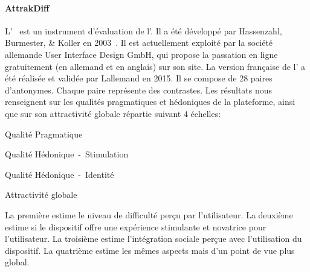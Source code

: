    \paragraph{AttrakDiff}\label{q:att}
    L'~ est un instrument  d’évaluation de l’. Il a été développé par Hassenzahl, Burmester, \& Koller en 2003~. Il est actuellement exploité par la société allemande User Interface Design GmbH, qui propose la passation en ligne gratuitement (en allemand et en anglais) sur son site. La version française de l’ a été réalisée et validée par Lallemand en 2015. Il se compose de 28 paires d’antonymes. Chaque paire représente des contrastes. %
    Les résultats nous renseignent sur les qualités pragmatiques et hédoniques de la plateforme, ainsi que sur son attractivité globale répartie suivant 4 échelles:
    \begin{enumerate}\myItemStyle
    \begin{multicols}{2}
        \item     Qualité Pragmatique
        \item     Qualité Hédonique~-~Stimulation
        \item     Qualité Hédonique~-~Identité
        \item     Attractivité globale
    \end{multicols}
    \end{enumerate}\par%
    La première estime le niveau de difficulté perçu par l'utilisateur.
    La deuxième estime si le dispositif offre une expérience stimulante et novatrice pour l'utilisateur.
    La troisième estime l'intégration sociale perçue avec l'utilisation du dispositif.
    La quatrième estime les mêmes aspects mais d'un point de vue plus global.

